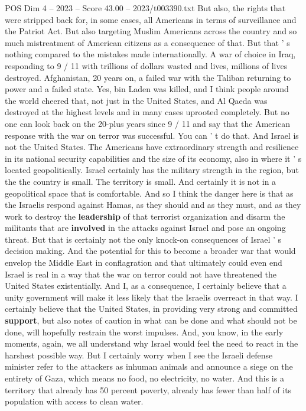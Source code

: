 \begin{textsample}{POS Dim 4 – 2023 – Score 43.00 – 2023/t003390.txt}
But also, the rights that were stripped back for, in some cases, all Americans in terms of surveillance and the Patriot Act.
But also targeting Muslim Americans across the country and so much mistreatment of American citizens as a consequence of that.
But that ' s nothing compared to the mistakes made internationally.
A war of choice in Iraq, responding to 9 / 11 with trillions of dollars wasted and lives, millions of lives destroyed.
Afghanistan, 20 years on, a failed war with the Taliban returning to power and a failed state.
Yes, bin Laden was killed, and I think people around the world cheered that, not just in the United States, and Al Qaeda was destroyed at the highest levels and in many cases uprooted completely.
But no one can look back on the 20-plus years since 9 / 11 and say that the American response with the war on terror was successful.
You can ' t do that.
And Israel is not the United States.
The Americans have extraordinary strength and resilience in its national security capabilities and the size of its economy, also in where it ' s located geopolitically.
Israel certainly has the military strength in the region, but the the country is small.
The territory is small.
And certainly it is not in a geopolitical space that is comfortable.
And so I think the danger here is that as the Israelis respond against Hamas, as they should and as they must, and as they work to destroy the \textbf{leadership} of that terrorist organization and disarm the militants that are \textbf{involved} in the attacks against Israel and pose an ongoing threat.
But that is certainly not the only knock-on consequences of Israel ' s decision making.
And the potential for this to become a broader war that would envelop the Middle East in conflagration and that ultimately could even end Israel is real in a way that the war on terror could not have threatened the United States existentially.
And I, as a consequence, I certainly believe that a unity government will make it less likely that the Israelis overreact in that way.
I certainly believe that the United States, in providing very strong and committed \textbf{support}, but also notes of caution in what can be done and what should not be done, will hopefully restrain the worst impulses.
And, you know, in the early moments, again, we all understand why Israel would feel the need to react in the harshest possible way.
But I certainly worry when I see the Israeli defense minister refer to the attackers as inhuman animals and announce a siege on the entirety of Gaza, which means no food, no electricity, no water.
And this is a territory that already has 50 percent poverty, already has fewer than half of its population with access to clean water.

\end{textsample}
